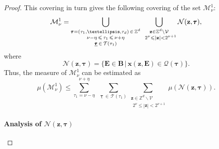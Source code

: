 \documentclass[10pt,a4paper]{amsart}
\newcommand{\Z}{\mathbb{Z}}
\newcommand{\bB}{\mathbf{B}}
\newcommand{\bE}{\mathbf{E}}
\newcommand{\cM}{\mathcal{M}}
\newcommand{\cN}{\mathcal{N}}
\newcommand{\cQ}{\mathcal{Q}}
\newcommand{\cT}{\mathcal{T}}
\newcommand{\cV}{\mathcal{V}}
\renewcommand{\leq}{\leqslant}
\renewcommand{\vec}[1]{\mathbf{#1}}
\begin{document}
\begin{proof}
  This covering in turn gives the following covering of the set $\cM^1_\nu$:
  \[
    \cM^1_\nu=
    \bigcup_{\substack{\pmb\tau=(\tau_1,\ldots,\tau_d)\,\in\,\Z^d \\ 
             \nu-\eta\,\leq\,\tau_1\,\leq\,\nu+\eta \vphantom{\frac11} \\ 
             \underline{\pmb\tau}\,\in\,\cT(\tau_1)}}
    \bigcup_{\substack{\vec z\in\Z^d\backslash\cV \\ 
             \,\ 2^\nu\leq|\vec z|<2^{\nu+1}}}
    \cN(\vec z,\pmb\tau),
  \]
  where
  \[
    \cN(\vec z,\pmb\tau)=
    \Big\{\bE\in\bB \,\Big|\, \vec x(\vec z,\bE)\in\cQ(\pmb\tau) \Big\}.
  \]
  Thus, the measure of $\cM^1_\nu$ can be estimated as
  \begin{equation}\label{eq:estimate_by_measure_of_N}
    \mu(\cM^1_\nu)\leq
    \sum_{\tau_1=\nu-\eta}^{\nu+\eta}\phantom{1}
    \sum_{\underline{\pmb\tau}\,\in\,\cT(\tau_1)}
    \sum_{\substack{\vec z\in\Z^d\backslash\cV \\ 
                    \,\ 2^\nu\leq|\vec z|<2^{\nu+1}}}
    \mu(\cN(\vec z,\pmb\tau)).
  \end{equation}
  
  \paragraph{\bf Analysis of $\cN(\vec z,\pmb\tau)$}
  

\end{proof}
\end{document}
